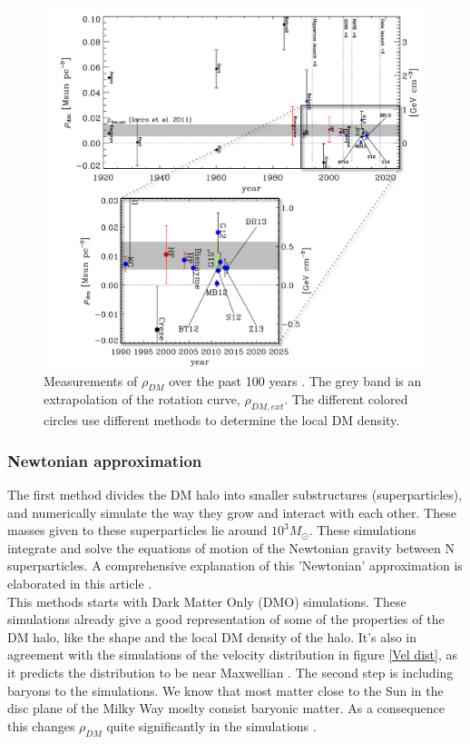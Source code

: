 \documentclass{article}
\begin{document}
\begin{figure}[h!]
    \centering
    \includegraphics[width=\textwidth]{Century.png}
    \caption{Measurements of $\rho_{DM}$ over the past 100 years \cite{Read:2014qva}. The grey band is an extrapolation of the rotation curve, $\rho_{DM,ext}$. The different colored circles use different methods to determine the local DM density.}
    \label{Century}
\end{figure}

\subsubsection{Newtonian approximation}
The first method divides the DM halo into smaller substructures (superparticles), and numerically simulate the way they grow and interact with each other. These masses given to these superparticles lie around $10^{3}M_{\odot}$. These simulations integrate and solve the equations of motion of the Newtonian gravity between N superparticles. A comprehensive explanation of this 'Newtonian' approximation is elaborated in this article \cite{Dehnen:2011fj}. \\
This methods starts with Dark Matter Only (DMO) simulations. These simulations already give a good representation of some of the properties of the DM halo, like the shape and the local DM density of the halo. It's also in agreement with the simulations of the velocity distribution in figure \ref{Vel dist}, as it predicts the distribution to be near Maxwellian \cite{Read:2014qva}. The second step is including baryons to the simulations. We know that most matter close to the Sun in the disc plane of the Milky Way moslty consist baryonic matter. As a consequence this changes $\rho_{DM}$ quite significantly in the simulations \cite{Read:2014qva}.  
\end{document}
